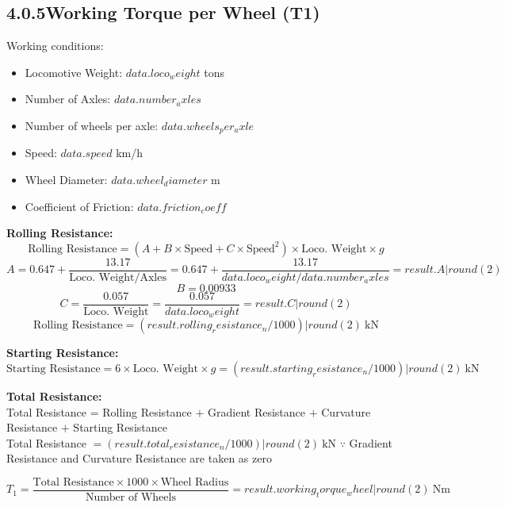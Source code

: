 \documentclass[14pt]{article}
\begin{document}
\subsection*{4.0.5\quad Working Torque per Wheel (T1)}
Working conditions:
\begin{itemize}[leftmargin=*]
  \item Locomotive Weight: ${{ data.loco_weight }}$ tons
  \item Number of Axles: ${{ data.number_axles }}$
  \item Number of wheels per axle: ${{ data.wheels_per_axle }}$
  \item Speed: ${{ data.speed }}$ km/h
  \item Wheel Diameter: ${{ data.wheel_diameter }}$ m
  \item Coefficient of Friction: ${{ data.friction_coeff }}$
\end{itemize}

\noindent\textbf{Rolling Resistance:}
\[ \text{Rolling Resistance} = (A + B \times \text{Speed} + C \times \text{Speed}^2) \times \text{Loco. Weight} \times g \]
\[ A = 0.647 + \frac{13.17}{\text{Loco. Weight} / \text{Axles}} = 0.647 + \frac{13.17}{ {{ data.loco_weight }} / {{ data.number_axles }} } = {{ result.A | round(2) }} \]
\[ B = 0.00933 \]
\[ C = \frac{0.057}{\text{Loco. Weight}} = \frac{0.057}{ {{ data.loco_weight }} } = {{ result.C | round(2) }} \]
\[ \text{Rolling Resistance} = {{ (result.rolling_resistance_n / 1000) | round(2) }}\ \mathrm{kN} \]

\noindent\textbf{Starting Resistance:}
\[ \text{Starting Resistance} = 6 \times \text{Loco. Weight} \times g = {{ (result.starting_resistance_n / 1000) | round(2) }}\ \mathrm{kN} \]

\noindent\textbf{Total Resistance:}\\
Total Resistance = Rolling Resistance $+$ Gradient Resistance $+$ Curvature Resistance $+$ Starting Resistance\\[0.5ex]
Total Resistance $= {{ (result.total_resistance_n / 1000) | round(2) }}\ \mathrm{kN}$
\quad $\because$ Gradient Resistance and Curvature Resistance are taken as zero

\[ T_1 = \frac{\text{Total Resistance} \times 1000 \times \text{Wheel Radius}}{\text{Number of Wheels}} = {{ result.working_torque_wheel | round(2) }}\ \mathrm{Nm} \]

\end{document}
